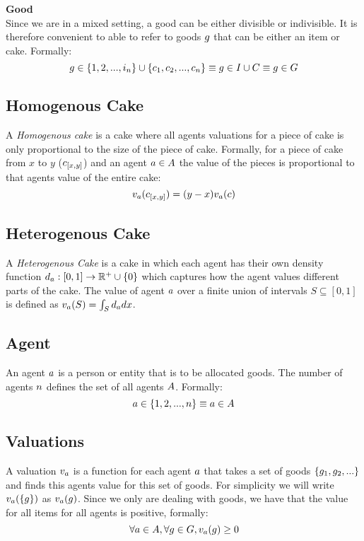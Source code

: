 \textbf{Good}\\
Since we are in a mixed setting, a good can be either divisible or indivisible. It is therefore convenient to able to refer to goods $g$ that can be either an item or cake. Formally:
$$g\in\{1,2,...,i_n\}\cup\{c_1, c_2, ...,c_n\}\equiv g\in I\cup C\equiv g\in G$$



\subsection*{Homogenous Cake}\label{subsec:homogenous-cake}
A \emph{Homogenous cake} is a cake where all agents valuations for a piece of cake is only proportional to the size of the piece of cake. Formally, for a piece of cake from $x$ to $y$ ($c_{[x,y]}$) and an agent $a\in A$ the value of the pieces is proportional to that agents value of the entire cake:
$$v_a(c_{[x,y]})=(y-x)v_a(c)$$



\subsection*{Heterogenous Cake}
A \emph{Heterogenous Cake} is a cake in which each agent has their own density function $d_a:[0,1]\rightarrow\mathbb{R}^+\cup\{0\}$ which captures how the agent values different parts of the cake. The value of agent $a$ over a finite union of intervals $S \subseteq [0, 1]$ is defined as $v_a(S) = \int_S d_a dx$.



\subsection*{Agent}
An agent $a$ is a person or entity that is to be allocated goods. The number of agents $n$ defines the set of all agents $A$. Formally:
$$a\in\{1,2,...,n\}\equiv a\in A$$



\subsection*{Valuations}
A valuation $v_a$ is a function for each agent $a$ that takes a set of goods $\{g_1, g_2,...\}$ and finds this agents value for this set of goods. For simplicity we will write $v_a(\{g\})$ as $v_a(g)$. Since we only are dealing with goods, we have that the value for all items for all agents is positive, formally:
$$\forall a\in A, \forall g\in G, v_a(g)\geq0$$



